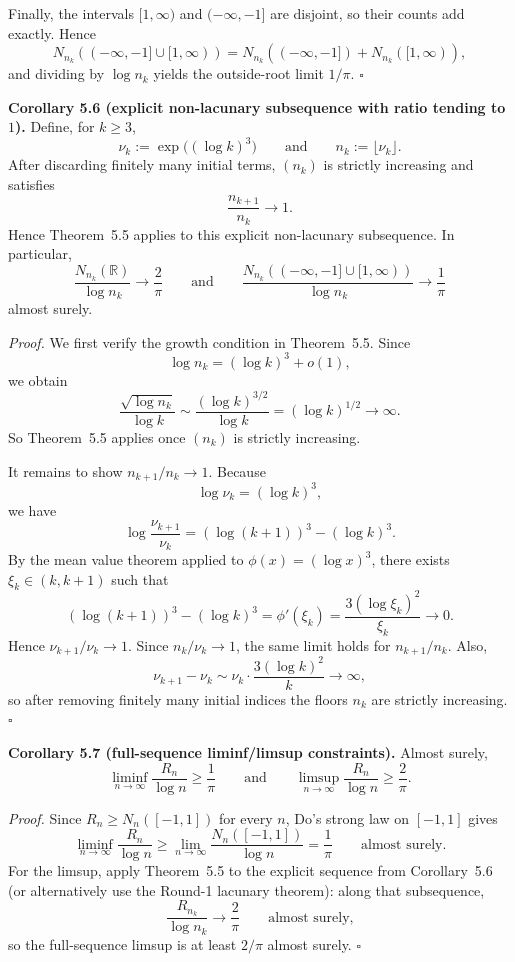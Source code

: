Finally, the intervals $[1,\infty)$ and $(-\infty,-1]$ are disjoint, so their counts add exactly. Hence
\[
N_{n_k}((-\infty,-1]\cup[1,\infty))
= N_{n_k}((-\infty,-1]) + N_{n_k}([1,\infty)),
\]
and dividing by $\log n_k$ yields the outside-root limit $1/\pi$.
\hfill$\square$

\medskip
\noindent\textbf{Corollary 5.6 (explicit non-lacunary subsequence with ratio tending to $1$).}
Define, for $k\ge3$,
\[
\nu_k:=\exp\bigl((\log k)^3\bigr)
\qquad\text{and}\qquad
n_k:=\lfloor \nu_k\rfloor.
\]
After discarding finitely many initial terms, $(n_k)$ is strictly increasing and satisfies
\[
\frac{n_{k+1}}{n_k}\to1.
\]
Hence Theorem~5.5 applies to this explicit non-lacunary subsequence. In particular,
\[
\frac{N_{n_k}(\mathbb R)}{\log n_k}\to\frac{2}{\pi}
\qquad\text{and}\qquad
\frac{N_{n_k}((-\infty,-1]\cup[1,\infty))}{\log n_k}\to\frac{1}{\pi}
\]
almost surely.

\medskip
\noindent\emph{Proof.}
We first verify the growth condition in Theorem~5.5. Since
\[
\log n_k=(\log k)^3+o(1),
\]
we obtain
\[
\frac{\sqrt{\log n_k}}{\log k}
\sim \frac{(\log k)^{3/2}}{\log k}
=(\log k)^{1/2}\to\infty.
\]
So Theorem~5.5 applies once $(n_k)$ is strictly increasing.

It remains to show $n_{k+1}/n_k\to1$. Because
\[
\log \nu_k=(\log k)^3,
\]
we have
\[
\log \frac{\nu_{k+1}}{\nu_k}
=(\log(k+1))^3-(\log k)^3.
\]
By the mean value theorem applied to $\phi(x)=(\log x)^3$, there exists $\xi_k\in(k,k+1)$ such that
\[
(\log(k+1))^3-(\log k)^3
=\phi'(\xi_k)
=\frac{3(\log \xi_k)^2}{\xi_k}\to0.
\]
Hence $\nu_{k+1}/\nu_k\to 1$. Since $n_k/\nu_k\to1$, the same limit holds for $n_{k+1}/n_k$. Also,
\[
\nu_{k+1}-\nu_k\sim \nu_k\cdot \frac{3(\log k)^2}{k}\to\infty,
\]
so after removing finitely many initial indices the floors $n_k$ are strictly increasing.
\hfill$\square$

\medskip
\noindent\textbf{Corollary 5.7 (full-sequence liminf/limsup constraints).}
Almost surely,
\[
\liminf_{n\to\infty}\frac{R_n}{\log n}\ge \frac{1}{\pi}
\qquad\text{and}\qquad
\limsup_{n\to\infty}\frac{R_n}{\log n}\ge \frac{2}{\pi}.
\]

\medskip
\noindent\emph{Proof.}
Since $R_n\ge N_n([-1,1])$ for every $n$, Do's strong law on $[-1,1]$ gives
\[
\liminf_{n\to\infty}\frac{R_n}{\log n}
\ge
\lim_{n\to\infty}\frac{N_n([-1,1])}{\log n}
=\frac{1}{\pi}
\qquad\text{almost surely.}
\]
For the limsup, apply Theorem~5.5 to the explicit sequence from Corollary~5.6 (or alternatively use the Round-1 lacunary theorem): along that subsequence,
\[
\frac{R_{n_k}}{\log n_k}\to \frac{2}{\pi}
\qquad\text{almost surely,}
\]
so the full-sequence limsup is at least $2/\pi$ almost surely.
\hfill$\square$

